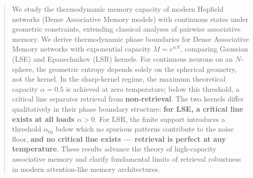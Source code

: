 \documentclass{article}
\theoremstyle{plain}
\theoremstyle{definition}
\theoremstyle{remark}
\begin{document}
\printAffiliationsAndNotice{}  %

\begin{abstract}
We study the thermodynamic memory capacity of modern Hopfield networks (Dense Associative Memory models) with continuous states under geometric constraints, extending classical analyses of pairwise associative memory. We derive thermodynamic phase boundaries for Dense Associative Memory networks with exponential capacity $M = e^{\alpha N}$, comparing Gaussian (LSE) and Epanechnikov (LSR) kernels. For continuous neurons on an $N$-sphere, the geometric entropy depends solely on the spherical geometry, not the kernel. In the sharp-kernel regime, the maximum theoretical capacity $\alpha = 0.5$ is achieved at zero temperature; below this threshold, a critical line separates retrieval from \textbf{non-retrieval}. The two kernels differ qualitatively in their phase boundary structure: \textbf{for LSE, a critical line exists at all loads $\alpha > 0$}. For LSR, the finite support introduces a threshold $\alpha_{\text{th}}$ below which no spurious patterns contribute to the noise floor, \textbf{and no critical line exists --- retrieval is perfect at any temperature}. These results advance the theory of high-capacity associative memory and clarify fundamental limits of retrieval robustness in modern attention-like memory architectures.
\end{abstract}
\end{document}
